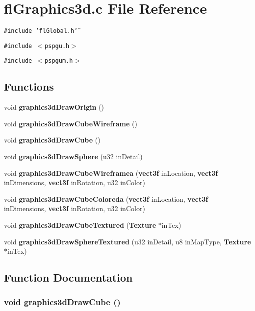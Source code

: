 \section{fl\-Graphics3d.c File Reference}
\label{flGraphics3d_8c}
{\tt \#include \char`\"{}fl\-Global.h\char`\"{}}\par
{\tt \#include $<$pspgu.h$>$}\par
{\tt \#include $<$pspgum.h$>$}\par
\subsection*{Functions}
\begin{CompactItemize}
\item 
void {\bf graphics3d\-Draw\-Origin} ()
\item 
void {\bf graphics3d\-Draw\-Cube\-Wireframe} ()
\item 
void {\bf graphics3d\-Draw\-Cube} ()
\item 
void {\bf graphics3d\-Draw\-Sphere} (u32 in\-Detail)
\item 
void {\bf graphics3d\-Draw\-Cube\-Wireframea} ({\bf vect3f} in\-Location, {\bf vect3f} in\-Dimensions, {\bf vect3f} in\-Rotation, u32 in\-Color)
\item 
void {\bf graphics3d\-Draw\-Cube\-Coloreda} ({\bf vect3f} in\-Location, {\bf vect3f} in\-Dimensions, {\bf vect3f} in\-Rotation, u32 in\-Color)
\item 
void {\bf graphics3d\-Draw\-Cube\-Textured} ({\bf Texture} $\ast$in\-Tex)
\item 
void {\bf graphics3d\-Draw\-Sphere\-Textured} (u32 in\-Detail, u8 in\-Map\-Type, {\bf Texture} $\ast$in\-Tex)
\end{CompactItemize}


\subsection{Function Documentation}
\subsubsection{\setlength{\rightskip}{0pt plus 5cm}void graphics3d\-Draw\-Cube ()}\label{flGraphics3d_8c_da479ff269707cfe2851e2ba7b964811}




